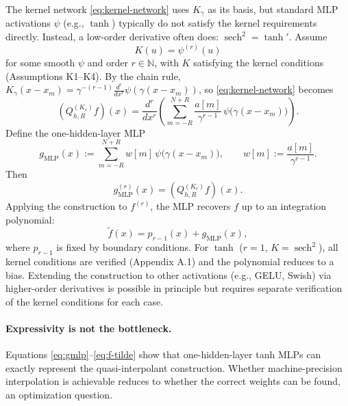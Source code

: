 \documentclass{article}
\begin{document}
The kernel network \eqref{eq:kernel-network} uses \(K_\gamma\) as its basis, but standard MLP activations \(\psi\) (e.g., \(\tanh\)) typically do not satisfy the kernel requirements directly. Instead, a low-order derivative often does: \(\operatorname{sech}^2 = \tanh'\). Assume
\begin{equation}
K(u) = \psi^{(r)}(u)
\label{eq:activation-kernel}
\end{equation}
for some smooth \(\psi\) and order \(r \in \mathbb{N}\), with \(K\) satisfying the kernel conditions (Assumptions K1--K4). By the chain rule, \(K_\gamma(x - x_m) = \gamma^{-(r-1)} \frac{d^r}{dx^r} \psi(\gamma(x - x_m))\), so \eqref{eq:kernel-network} becomes
\begin{equation}
(Q_{h,R}^{(K_c)} f)(x)
=
\frac{d^r}{dx^r}\!\left(
\sum_{m=-R}^{N+R} \frac{a[m]}{\gamma^{r-1}}\, \psi\big(\gamma(x - x_m)\big)
\right).
\label{eq:derivative-form}
\end{equation}
Define the one-hidden-layer MLP
\begin{equation}
g_{\mathrm{MLP}}(x)
:=
\sum_{m=-R}^{N+R} w[m]\, \psi\big(\gamma(x - x_m)\big),
\qquad
w[m] := \frac{a[m]}{\gamma^{r-1}}.
\label{eq:gmlp}
\end{equation}
Then
\begin{equation}
g_{\mathrm{MLP}}^{(r)}(x) = (Q_{h,R}^{(K_c)} f)(x).
\label{eq:gmlp-identity}
\end{equation}
Applying the construction to \(f^{(r)}\), the MLP recovers \(f\) up to an integration polynomial:
\begin{equation}
\widetilde{f}(x) = p_{r-1}(x) + g_{\mathrm{MLP}}(x),
\label{eq:f-tilde}
\end{equation}
where \(p_{r-1}\) is fixed by boundary conditions. For \(\tanh\) (\(r = 1\), \(K = \operatorname{sech}^2\)), all kernel conditions are verified (Appendix A.1) and the polynomial reduces to a bias. Extending the construction to other activations (e.g., GELU, Swish) via higher-order derivatives is possible in principle but requires separate verification of the kernel conditions for each case.

\paragraph{Expressivity is not the bottleneck.}
Equations \eqref{eq:gmlp}--\eqref{eq:f-tilde} show that one-hidden-layer tanh MLPs can exactly represent the quasi-interpolant construction. Whether machine-precision interpolation is achievable reduces to whether the correct weights can be found, an optimization question.
\end{document}
